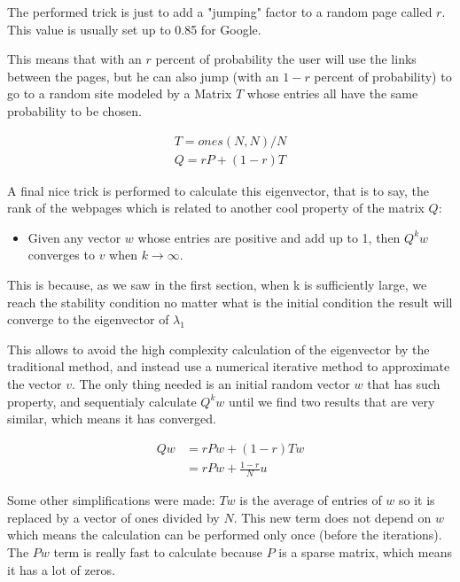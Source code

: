 \documentclass{article}
\begin{document}
The performed trick is just to add a "jumping" factor to a random
page called $r$. This value is usually set up to 0.85 for Google. 

This means that with an $r$ percent of probability the user will use the links
between the pages, but he can also jump (with an $1-r$ percent of probability) 
to go to a random site modeled by a Matrix $T$ whose entries all have the same
probability to be chosen.

\begin{equation}
\begin{aligned}
T = ones(N,N) / N	\\
Q = rP + (1-r)T
\end{aligned}
\label{eq:q}
\end{equation} 

A final nice trick is performed to calculate this eigenvector, that is to say,
the rank of the webpages which is related to another cool property of the matrix $Q$:

\begin{itemize}
\item Given any vector $w$ whose entries are positive and add up to 1, then $Q^k w$ 
converges to $v$ when $k\to\infty$.
\end{itemize} 

This is because, as we saw in the first section, 
when k is sufficiently large, we reach the stability condition no matter what is
the initial condition the result will converge to the eigenvector of $\lambda_1$

This allows to avoid the high complexity calculation of the eigenvector by
the traditional method, and instead use a numerical iterative method to approximate the
vector $v$. The only thing needed is an initial random vector $w$ that has such property, 
and sequentialy calculate $Q^k w$ until we find two results that are very similar, which means
it has converged. 

\begin{equation*}
\begin{aligned}
Q w &= r P w + (1-r) T w \\
	&= r P w + \frac{1-r}{N} u 
\end{aligned}
\end{equation*} 

Some other simplifications were made: $T w$ is the average of entries of $w$ so it is replaced by a vector
of ones divided by $N$.
This new term does not depend on $w$ which means the calculation
can be performed only once (before the iterations).
The $P w$ term is really
fast to calculate because $P$ is a sparse matrix, 
which means it has a lot of zeros.
\end{document}
